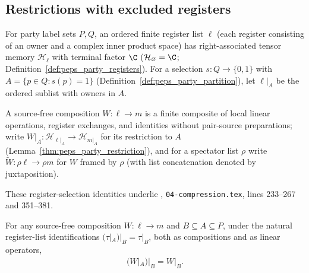 \subsection{Restrictions with excluded registers}

For party label sets $P,Q$, an ordered finite register list $\ell$ (each register consisting of an owner and a complex inner product space) has right-associated tensor memory $\mathcal H_\ell$ with terminal factor $\C$ ($\mathcal H_\varnothing=\C$; Definition~\ref{def:peps_party_registers}).
For a selection $s:Q\to\{0,1\}$ with $A=\{p\in Q:s(p)=1\}$ (Definition~\ref{def:peps_party_partition}), let $\ell|_A$ be the ordered sublist with owners in $A$.

A source-free composition $W:\ell\to m$ is a finite composite of local linear operations, register exchanges, and identities without pair-source preparations; write $W|_A:\mathcal H_{\ell|_A}\to\mathcal H_{m|_A}$ for its restriction to $A$ (Lemma~\ref{thm:peps_party_restriction}), and for a spectator list $\rho$ write $\widetilde W:\rho\ell\to\rho m$ for $W$ framed by $\rho$ (with list concatenation denoted by juxtaposition).


These register-selection identities underlie \cite[proof of Theorem~5.2]{OpenAI2026PolynomialPEPS}, \texttt{04-compression.tex}, lines 233--267 and 351--381.

\begin{lemma}
    \label{thm:peps_nested_party_restrictions}
    \leanok
    For any source-free composition $W:\ell\to m$ and $B\subseteq A\subseteq P$, under the natural register-list identifications $(\tau|_A)|_B=\tau|_B$, both as compositions and as linear operators,
    \begin{align}
        (W|_A)|_B=W|_B.
        \label{eq:peps_nested_party_restrictions}
    \end{align}
\end{lemma}

